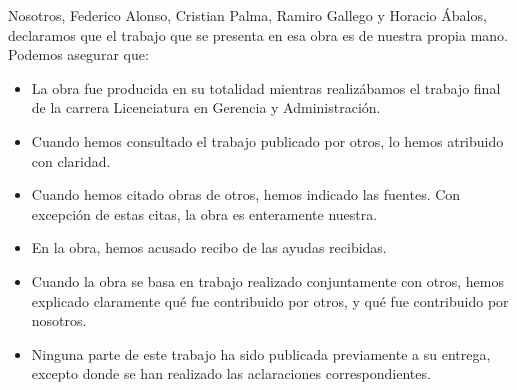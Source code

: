 \label{ch:declaracion-de-autoria}


Nosotros, Federico Alonso, Cristian Palma, Ramiro Gallego y Horacio Ábalos, declaramos que el trabajo que se presenta en esa obra es de nuestra propia mano. Podemos asegurar que:
\begin{itemize}
    \item La obra fue producida en su totalidad mientras realizábamos el trabajo final de la carrera Licenciatura en Gerencia y Administración.
    \item Cuando hemos consultado el trabajo publicado por otros, lo hemos atribuido con claridad.
    \item Cuando hemos citado obras de otros, hemos indicado las fuentes. Con excepción de estas citas, la obra es enteramente nuestra.
    \item En la obra, hemos acusado recibo de las ayudas recibidas.
    \item Cuando la obra se basa en trabajo realizado conjuntamente con otros, hemos explicado claramente qué fue contribuido por otros, y qué fue contribuido por nosotros.
    \item Ninguna parte de este trabajo ha sido publicada previamente a su entrega, excepto donde se han realizado las aclaraciones correspondientes.
\end{itemize}

